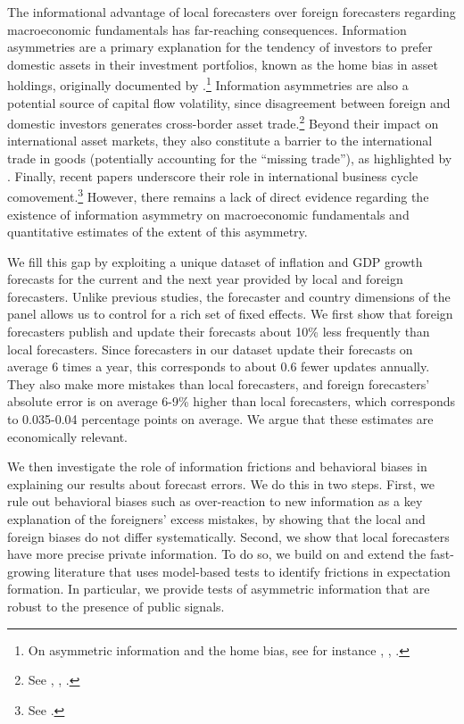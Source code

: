 
\label{sec:introduction}
The informational advantage of local forecasters over foreign forecasters regarding macroeconomic fundamentals has far-reaching consequences. Information asymmetries are a primary explanation for the tendency of investors to prefer domestic assets in their investment portfolios, known as the home bias in asset holdings, originally documented by  \citet{FrenchPoterba1991}.\footnote{On asymmetric information and the home bias, see for instance \citet{Admati1985}, \citet{Portesetal2001}, \citet{DeMarcoetal2021}.} Information asymmetries are also a potential source of capital flow volatility, since disagreement between foreign and domestic investors generates cross-border asset trade.\footnote{See \citet{BrennanCao1997},  \citet{TillevanWincoop2014}, \citet{BenhimaCordonier2022}.} Beyond their impact on international asset markets, they also constitute a barrier to the international trade in goods (potentially accounting for the ``missing trade''), as highlighted by \citet{AndersonvanWincoop2004}. Finally, recent papers underscore their role in international business cycle comovement.\footnote{See \citet{Buietal2021}.} However, there remains a lack of direct evidence regarding the existence of information asymmetry on macroeconomic fundamentals and quantitative estimates of the extent of this asymmetry.

We fill this gap by exploiting a unique dataset of inflation and GDP growth forecasts for the current and the next year provided by local and foreign forecasters. Unlike previous studies, the forecaster and country dimensions of the panel allows us to control for a rich set of fixed effects. We first show that foreign forecasters publish and update their forecasts about 10\% less frequently than local forecasters. Since forecasters in our dataset update their forecasts on average 6 times a year, this corresponds to about 0.6 fewer updates annually. They also make more mistakes than local forecasters, and foreign forecasters' absolute error is on average 6-9\% higher than local forecasters, which corresponds to 0.035-0.04 percentage points on average. We argue that these estimates are economically relevant.

We then investigate the role of information frictions and behavioral biases in explaining our results about forecast errors. We do this in two steps. First, we rule out behavioral biases such as over-reaction to new information as a key explanation of the foreigners' excess mistakes, by showing that the local and foreign biases do not differ systematically. Second, we show that local forecasters have more precise private information. To do so, we build on and extend the fast-growing literature that uses model-based tests to identify frictions in expectation formation. In particular, we provide tests of asymmetric information that are robust to the presence of public signals.

